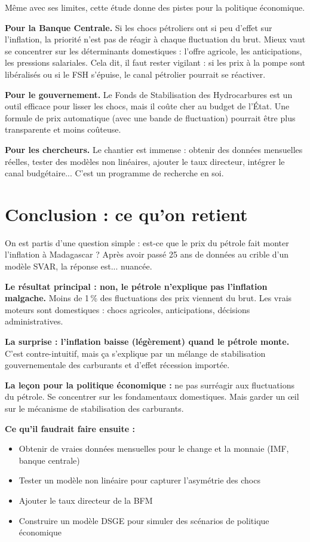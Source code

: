 \documentclass[12pt,a4paper]{article}
\begin{document}
Même avec ses limites, cette étude donne des pistes pour la politique économique.

\textbf{Pour la Banque Centrale.} Si les chocs pétroliers ont si peu d'effet sur l'inflation, la priorité n'est pas de réagir à chaque fluctuation du brut. Mieux vaut se concentrer sur les déterminants domestiques : l'offre agricole, les anticipations, les pressions salariales. Cela dit, il faut rester vigilant : si les prix à la pompe sont libéralisés ou si le FSH s'épuise, le canal pétrolier pourrait se réactiver.

\textbf{Pour le gouvernement.} Le Fonds de Stabilisation des Hydrocarbures est un outil efficace pour lisser les chocs, mais il coûte cher au budget de l'État. Une formule de prix automatique (avec une bande de fluctuation) pourrait être plus transparente et moins coûteuse.

\textbf{Pour les chercheurs.} Le chantier est immense : obtenir des données mensuelles réelles, tester des modèles non linéaires, ajouter le taux directeur, intégrer le canal budgétaire... C'est un programme de recherche en soi.

\section{Conclusion : ce qu'on retient}

On est partis d'une question simple : est-ce que le prix du pétrole fait monter l'inflation à Madagascar ? Après avoir passé 25 ans de données au crible d'un modèle SVAR, la réponse est... nuancée.

\textbf{Le résultat principal : non, le pétrole n'explique pas l'inflation malgache.} Moins de 1\,\% des fluctuations des prix viennent du brut. Les vrais moteurs sont domestiques : chocs agricoles, anticipations, décisions administratives.

\textbf{La surprise : l'inflation baisse (légèrement) quand le pétrole monte.} C'est contre-intuitif, mais ça s'explique par un mélange de stabilisation gouvernementale des carburants et d'effet récession importée.

\textbf{La leçon pour la politique économique :} ne pas surréagir aux fluctuations du pétrole. Se concentrer sur les fondamentaux domestiques. Mais garder un œil sur le mécanisme de stabilisation des carburants.

\textbf{Ce qu'il faudrait faire ensuite :}
\begin{itemize}
  \item Obtenir de vraies données mensuelles pour le change et la monnaie (IMF, banque centrale)
  \item Tester un modèle non linéaire pour capturer l'asymétrie des chocs
  \item Ajouter le taux directeur de la BFM
  \item Construire un modèle DSGE pour simuler des scénarios de politique économique
\end{itemize}
\end{document}
